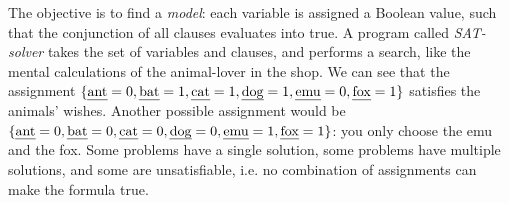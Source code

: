 


The objective is to find a \emph{model}: each variable is assigned a Boolean value, such that the conjunction of all clauses evaluates into true. A program called \emph{SAT-solver} takes the set of variables and clauses, and performs a search, like the mental calculations of the animal-lover in the shop.
We can see that the assignment $\{\text{\em ant}=0, \text{\em bat}=1, \text{\em cat}=1, \text{\em dog}=1, \text{\em emu}=0, \text{\em fox}=1\}$
satisfies the animals' wishes.
Another possible assignment would be $\{\text{\em ant}=0, \text{\em bat}=0, \text{\em cat}=0, \text{\em dog}=0, \text{\em emu}=1, \text{\em fox}=1\}$: you only choose the emu and the fox.
Some problems have a single solution, some problems have multiple solutions, and some are unsatisfiable, i.e. no combination of assignments can make the formula true.

